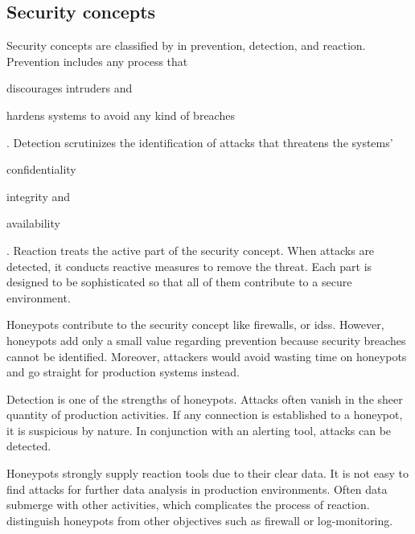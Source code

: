 \subsection{Security concepts}
\label{subsec:honeypot-security-concept}

Security concepts are classified by \citet{Schneier2004} in prevention, detection, and reaction.
Prevention includes any process that
\begin{enumerate*}[label=(\roman*)]
    \item discourages intruders and
    \item hardens systems to avoid any kind of breaches
\end{enumerate*}.
Detection scrutinizes the identification of attacks that threatens the systems'
\begin{enumerate*}[label=(\roman*)]
    \item confidentiality
    \item integrity and
    \item availability
\end{enumerate*}.
Reaction treats the active part of the security concept.
When attacks are detected, it conducts reactive measures to remove the threat.
Each part is designed to be sophisticated so that all of them contribute to a secure environment. \cite{NawrockiWSKS2016}

Honeypots contribute to the security concept like firewalls, or \acp{ids}. However, honeypots add only a small value regarding prevention because security breaches cannot be identified.
Moreover, attackers would avoid wasting time on honeypots and go straight for production systems instead.

Detection is one of the strengths of honeypots.
Attacks often vanish in the sheer quantity of production activities.
If any connection is established to a honeypot, it is suspicious by nature.
In conjunction with an alerting tool, attacks can be detected.

Honeypots strongly supply reaction tools due to their clear data.
It is not easy to find attacks for further data analysis in production environments.
Often data submerge with other activities, which complicates the process of reaction. \cite{NawrockiWSKS2016}
\citet{NawrockiWSKS2016} distinguish honeypots from other objectives such as firewall or log-monitoring.


